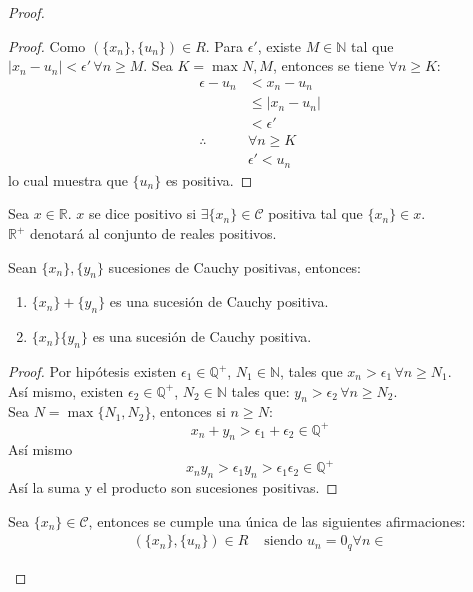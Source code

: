 \begin{proof}
\begin{proof}
  Como $(\{x_n\},\{u_n\}) \in R $. Para $\epsilon'$, existe $M \in \mathbb{N}$
  tal que $|x_n-u_n| < \epsilon' \, \forall n \geq M$.
  Sea $K = \max{N,M}$, entonces se tiene $\forall n \geq K$:
  \begin{align*}
    \epsilon - u_n &< x_n-u_n \\
                   &\leq |x_n-u_n| \\
                   &< \epsilon' \\
    \therefore &\forall n\geq K \\
               &\epsilon' < u_n
  \end{align*}
  lo cual muestra que $\{u_n\}$ es positiva.
\end{proof}
\begin{definition}
  Sea $x \in \mathbb{R}$. $x$ se dice positivo si $\exists \{x_n\} \in
  \mathcal{C}$ positiva tal que $\{x_n\} \in x$.\\
  $\mathbb{R}^+$ denotará al conjunto de reales positivos.
\end{definition}
\begin{proposition}\label{prop:48}
  Sean $\{x_n\}, \{y_n\}$ sucesiones de Cauchy positivas, entonces:
  \begin{enumerate}
    \item $\{x_n\} + \{y_n\}$ es una sucesión de Cauchy positiva.
    \item $\{x_n\}  \{y_n\}$ es una sucesión de Cauchy positiva.
  \end{enumerate}
\end{proposition}
\begin{proof}
  Por hipótesis existen $\epsilon_1 \in \mathbb{Q}^+$, $N_1 \in \mathbb{N}$,
  tales que $x_n > \epsilon_1 \, \forall n \geq N_1$. \\
  Así mismo, existen $\epsilon_2 \in \mathbb{Q}^+$, $N_2 \in \mathbb{N}$ tales
  que: $y_n > \epsilon_2 \, \forall n \geq N_2$.\\
  Sea $N = \max\{N_1,N_2\}$, entonces si $n \geq N$:
  \[
    x_n+y_n > \epsilon_1 + \epsilon_2 \in \mathbb{Q}^+
  \]
  Así mismo
  \[
    x_ny_n > \epsilon_1y_n > \epsilon_1\epsilon_2 \in \mathbb{Q}^+
  \]
  Así la suma y el producto son sucesiones positivas.
\end{proof}
\begin{proposition}{\label{prop:49}}
  Sea $\{x_n\} \in \mathcal{C}$, entonces se cumple una única de las
  siguientes afirmaciones:
  \begin{align*}
    (\{x_n\},\{u_n\}) \in R &\mbox{ siendo } u_n = 0_q \forall n \in

\end{align*}
\end{proposition}
\end{proof}
